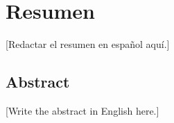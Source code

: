 
\chapter{Resumen}

%

[Redactar el resumen en español aquí.]


\section*{Abstract}


[Write the abstract in English here.]
